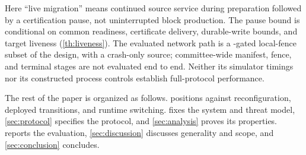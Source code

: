 Here ``live migration'' means continued source service during preparation followed by a certification
pause, not uninterrupted block production. The pause bound is conditional on common readiness,
certificate delivery, durable-write bounds, and target liveness (\cref{th:liveness}). The evaluated
network path is a \CutCert-gated local-fence subset of the design, with a crash-only source;
committee-wide manifest, fence, and terminal stages are not evaluated end to end. Neither its
simulator timings nor its constructed process controls establish full-protocol performance.

The rest of the paper is organized as follows.  positions \sage{} against
reconfiguration, deployed transitions, and runtime switching.  fixes the system and
threat model, \cref{sec:protocol} specifies the protocol, and \cref{sec:analysis} proves its
properties.  reports the evaluation, \cref{sec:discussion} discusses generality and
scope, and \cref{sec:conclusion} concludes.
